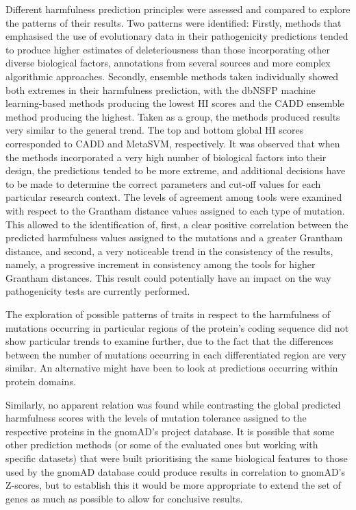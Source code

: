 \documentclass[12pt,MSc,wordcount,anon]{muthesis}
\begin{document}
\begin{flushleft}
Different harmfulness prediction principles were assessed and compared to explore the patterns of their results. Two patterns were identified: Firstly, methods that emphasised the use of evolutionary data in their pathogenicity predictions tended to produce higher estimates of deleteriousness than those incorporating other diverse biological factors, annotations from several sources and more complex algorithmic approaches. Secondly, ensemble methods taken individually showed both extremes in their harmfulness prediction, with the dbNSFP machine learning-based methods producing the lowest HI scores and the CADD ensemble method producing the highest. Taken as a group, the methods produced results very similar to the general trend. The top and bottom global HI scores corresponded to CADD and MetaSVM, respectively. It was observed that when the methods incorporated a very high number of biological factors into their design, the predictions tended to be more extreme, and additional decisions have to be made to determine the correct parameters and cut-off values for each particular research context.
The levels of agreement among tools were examined with respect to the Grantham distance values assigned to each type of mutation. This allowed to the identification of, first, a clear positive correlation between the predicted harmfulness values assigned to the mutations and a greater Grantham distance, and second, a very noticeable trend in the consistency of the results, namely, a progressive increment in consistency among the tools for higher Grantham distances. This result could potentially have an impact on the way pathogenicity tests are currently performed.

The exploration of possible patterns of traits in respect to the harmfulness of mutations occurring in particular regions of the protein's coding sequence did not show particular trends to examine further, due to the fact that the differences between the number of mutations occurring in each differentiated region are very similar. An alternative might have been to look at predictions occurring within protein domains.

Similarly, no apparent relation was found while contrasting the global predicted harmfulness scores with the levels of mutation tolerance assigned to the respective proteins in the gnomAD's project database. It is possible that some other prediction methods (or some of the evaluated ones but working with specific datasets) that were built prioritising the same biological features to those used by the gnomAD database could produce results in correlation to gnomAD's Z-scores, but to establish this it would be more appropriate to extend the set of genes as much as possible to allow for conclusive results.


\end{flushleft}
\end{document}
